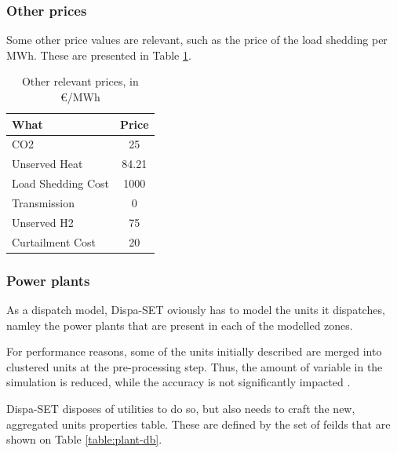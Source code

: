 \subsubsection{Other prices}

Some other price values are relevant, such as the price of the load shedding per MWh. These are presented in Table \ref{table:other-prices}.

\begin{table}[h]
    \centering
	\begin{tabular}{|l c|}
		\hline
		What & Price \\
		\hline
		CO2                & 25 \\
		Unserved Heat      & 84.21\\
		Load Shedding Cost & 1000\\
		Transmission       & 0\\
		Unserved H2        & 75\\
		Curtailment Cost   & 20 \\
		\hline
	\end{tabular}
	\caption{Other relevant prices, in €/MWh}
	\label{table:other-prices}
\end{table}

\subsubsection{Power plants}

As a dispatch model, Dispa-SET oviously has to model the units it dispatches, namley the power plants that are present in each of the modelled zones.

For performance reasons, some of the units initially described are merged into clustered units at the pre-processing step. Thus, the amount of variable in the simulation is reduced, while the accuracy is not significantly impacted \cite{dispaset}.

Dispa-SET disposes of utilities to do so, but also needs to craft the new, aggregated units properties table. These are defined by the set of feilds that are shown on Table \ref{table:plant-db}.

